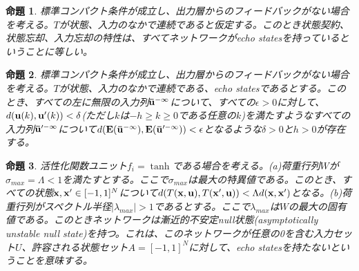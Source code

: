 \documentclass{jsarticle}
\newtheorem{pps}{命題}
\begin{document}
\begin{pps}
標準コンパクト条件が成立し、出力層からのフィードバックがない場合を考える。$T$が状態、入力のなかで連続であると仮定する。このとき状態契約、状態忘却、入力忘却の特性は、すべてネットワークがecho statesを持っているということに等しい。
\end{pps}
\begin{pps}
標準コンパクト条件が成立し、出力層からのフィードバックがない場合を考える。$T$が状態、入力のなかで連続である、echo statesであるとする。このとき、すべての左に無限の入力列${\bf \bar u}^{- \infty}$について、すべての$\epsilon >0$に対して、$d({\bf u}(k),{{\bf u}'}(k))<\delta$(ただし$k$は$-h \geq k \geq 0$である任意の$k$)を満たすようなすべての入力列${\bf {\bar u}}'^{- \infty}$について$d({\bf E}({\bf \bar u}^{- \infty}),{\bf E}({\bf \bar u}'^{- \infty}))< \epsilon$となるような$\delta >0$と$h >0$が存在する。
\end{pps}
\begin{pps}
活性化関数ユニット$f_{i}=\tanh$である場合を考える。(a)荷重行列$W$が$\sigma_{max}=\Lambda < 1$を満たすとする。ここで$\sigma_{max}$は最大の特異値である。このとき、すべての状態${\bf x},{\bf x'}\in [-1,1]^{N}$について$d(T({\bf x},{\bf u}),T({\bf x'},{\bf u}))< \Lambda d({\bf x}, {\bf x'})$となる。(b)荷重行列がスペクトル半径$|\lambda_{max}|>1$であるとする。ここで$\lambda_{max}$は$W$の最大の固有値である。このときネットワークは漸近的不安定null状態(asymptotically unstable null state)を持つ。これは、このネットワークが任意の0を含む入力セット$U$、許容される状態セット$A=[-1,1]^{N}$に対して、echo statesを持たないということを意味する。
\end{pps}
\end{document}
